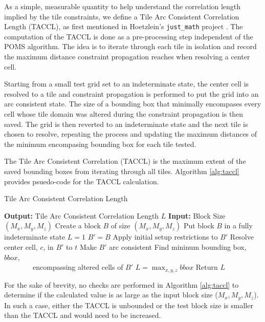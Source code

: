As a simple, measurable quantity to help understand the correlation length implied by the tile constraints, we define a Tile Arc Consistent Correlation
Length (TACCL), as first mentioned in Hoetzlein's \texttt{just\_math} project \cite{Hoetzlein_2023}.
The computation of the TACCL is done as a pre-processing step independent of the POMS algorithm.
The idea is to iterate through each tile in isolation and record the maximum distance constraint propagation reaches when resolving a center cell.

Starting from a small test grid set to an indeterminate state,
the center cell is resolved to a tile and constraint propagation is performed to put the grid
into an arc consistent state.
The size of a bounding box that minimally encompases every cell whose tile domain was altered during the constraint propagation is then saved.
The grid is then reverted to an indeterminate state and the next tile is chosen to resolve, repeating the process and updating the maximum distances
of the minimum encompasing bounding box for each tile tested.

The Tile Arc Consistent Correlation (TACCL) is the maximum extent of the saved bounding boxes from iterating through all tiles.
Algorithm \ref{alg:taccl} provides psuedo-code for the TACCL calculation.

\begin{algorithm}
  \caption{Tile Arc Consistent Correlation Length}
  \label{alg:taccl}
  \begin{algorithmic}
    \State \textbf{Output:} Tile Arc Consistent Correlation Length $L$
    \State \textbf{Input:} Block Size $(M _ x, M _ y, M _ z)$
    \State Create a block $B$ of size $(M _ x, M _ y, M _ z)$
    \State Put block $B$ in a fully indeterminate state
    \State $L=1$
      \State $B' = B$
      \State Apply initial setup restrictions to $B'$
      \State Resolve center cell, $c$, in $B'$ to $t$
      \State Make $B'$ arc consistent
      \State Find mininum bounding box, $bbox$, \\ \ \ \ \ \ \ \ \ encompassing altered cells of $B'$
        \State $L = \max _ { x, y, z } bbox $
      \EndIf
    \EndFor
    \State Return $L$
  \end{algorithmic}
\end{algorithm}


For the sake of brevity, no checks are performed in Algorithm \ref{alg:taccl} to determine if the calculated value
is as large as the input block size ($M _ x, M _ y, M _ z$).
In such a case, either the TACCL is unbounded or the test block size is smaller than the TACCL and would
need to be increased.

